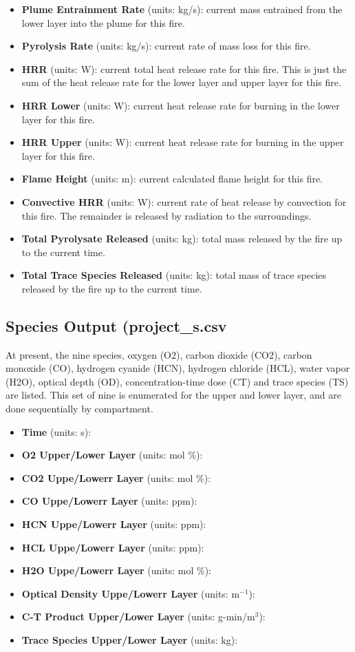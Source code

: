 \begin{itemize}
\item \textbf{Plume Entrainment Rate} (units: kg/s): current mass entrained from the lower layer into the plume for this fire.
\item \textbf{Pyrolysis Rate} (units: kg/s): current rate of mass loss for this fire.
\item \textbf{HRR} (units: W): current total heat release rate for this fire. This is just the sum of the heat release rate for the lower layer and upper layer for this fire.
\item \textbf{HRR Lower} (units: W): current heat release rate for burning in the lower layer for this fire.
\item \textbf{HRR Upper} (units: W):  current heat release rate for burning in the upper layer for this fire.
\item \textbf{Flame Height} (units: m): current calculated flame height for this fire.
\item \textbf{Convective HRR} (units: W): current rate of heat release by convection for this fire.  The remainder is released by radiation to the surroundings.
\item \textbf{Total Pyrolysate Released} (units: kg): total mass released by the fire up to the current time.
\item \textbf{Total Trace Species Released} (units: kg): total mass of trace species released by the fire up to the current time.
\end{itemize}

\subsection{Species Output (project\_s.csv}

At present, the nine species, oxygen (O2), carbon dioxide (CO2), carbon monoxide (CO),  hydrogen cyanide (HCN), hydrogen chloride (HCL), water vapor (H2O), optical depth (OD), concentration-time dose (CT) and trace species (TS) are listed. This set of nine is enumerated for the upper and lower layer, and are done sequentially by compartment.

\begin{itemize}
\item \textbf{Time} (units: s): 
\item \textbf{O2 Upper/Lower Layer} (units: mol \%): 
\item \textbf{CO2 Uppe/Lowerr Layer} (units: mol \%): 
\item \textbf{CO Uppe/Lowerr Layer} (units: ppm): 
\item \textbf{HCN Uppe/Lowerr Layer} (units: ppm): 
\item \textbf{HCL Uppe/Lowerr Layer} (units: ppm): 
\item \textbf{H2O Uppe/Lowerr Layer} (units: mol \%): 
\item \textbf{Optical Density Uppe/Lowerr Layer} (units: m$^{-1}$): 
\item \textbf{C-T Product Upper/Lower Layer} (units: g-min/m$^3$): 
\item \textbf{Trace Species Upper/Lower Layer} (units: kg): 
\end{itemize}

